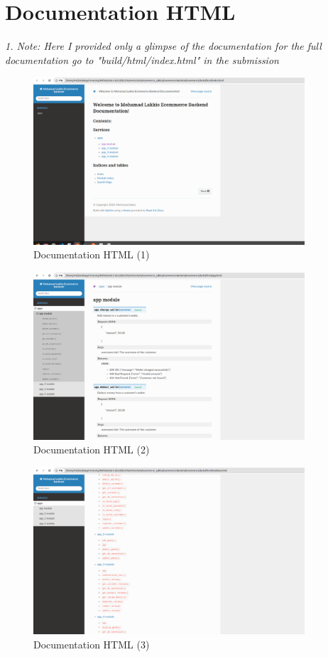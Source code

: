 \documentclass[a4paper,12pt]{article}
\begin{document}
\section{Documentation HTML}
\textit{1. Note: Here I provided only a glimpse of the documentation for the full documentation go to "build/html/index.html" in the submission}
\begin{figure}[H]
  \centering
  \includegraphics[width=0.9\textwidth]{images/40.png}
  \caption{Documentation HTML (1)}
\end{figure}
\begin{figure}[H]
  \centering
  \includegraphics[width=0.9\textwidth]{images/41.png}
  \caption{Documentation HTML (2)}
\end{figure}
\begin{figure}[H]
  \centering
  \includegraphics[width=0.9\textwidth]{images/42.png}
  \caption{Documentation HTML (3)}
\end{figure}
\end{document}
